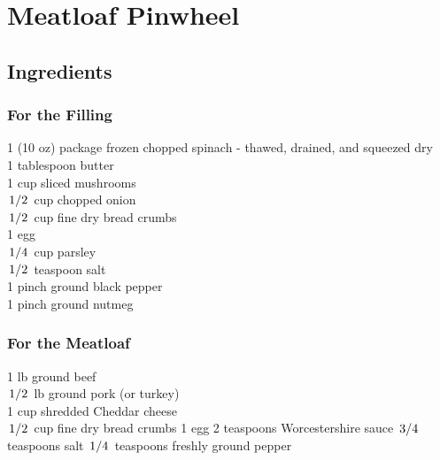 \documentclass{article}
\begin{document}
\newcommand{\slfrac}[2]{\left.#1\middle/#2\right.}
\newcommand{\degree}{\ensuremath{^\circ}}

\section*{Meatloaf Pinwheel}



\subsection*{Ingredients}
\subsubsection*{For the Filling}

1 (10 oz) package frozen chopped spinach - thawed, drained, and squeezed dry\\
1 tablespoon butter\\
1 cup sliced mushrooms\\
$\slfrac{1}{2}$ cup chopped onion\\
$\slfrac{1}{2}$ cup fine dry bread crumbs\\
1 egg\\
$\slfrac{1}{4}$ cup parsley\\
$\slfrac{1}{2}$ teaspoon salt\\
1 pinch ground black pepper\\
1 pinch ground nutmeg\\

\subsubsection*{For the Meatloaf}

1 lb ground beef\\
$\slfrac{1}{2}$ lb ground pork (or turkey)\\
1 cup shredded Cheddar cheese\\
$\slfrac{1}{2}$ cup fine dry bread crumbs
1 egg
2 teaspoons Worcestershire sauce
$\slfrac{3}{4}$ teaspoons salt
$\slfrac{1}{4}$ teaspoons freshly ground pepper
\end{document}

